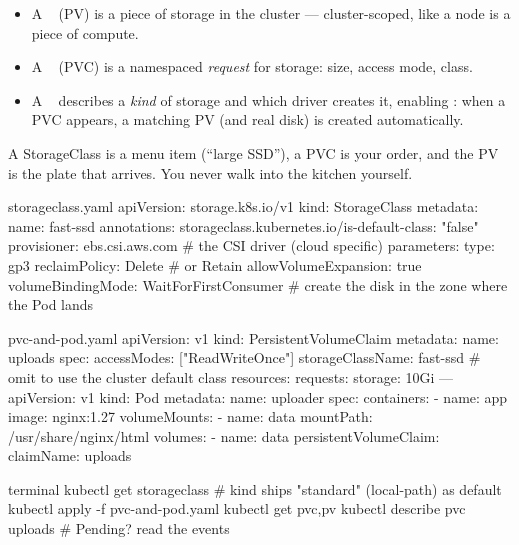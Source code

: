 \begin{itemize}
  \item A ~ (PV) is a piece of storage in the
        cluster --- cluster-scoped, like a node is a piece of compute.
  \item A ~ (PVC) is a namespaced
        \emph{request} for storage: size, access mode, class.
  \item A ~ describes a \emph{kind} of storage and
        which driver creates it, enabling : when a
        PVC appears, a matching PV (and real disk) is created automatically.
\end{itemize}

\begin{analogy}
A StorageClass is a menu item (``large SSD''), a PVC is your order, and the PV
is the plate that arrives. You never walk into the kitchen yourself.
\end{analogy}

\begin{yamlcode}{storageclass.yaml}
apiVersion: storage.k8s.io/v1
kind: StorageClass
metadata:
  name: fast-ssd
  annotations:
    storageclass.kubernetes.io/is-default-class: "false"
provisioner: ebs.csi.aws.com        # the CSI driver (cloud specific)
parameters:
  type: gp3
reclaimPolicy: Delete               # or Retain
allowVolumeExpansion: true
volumeBindingMode: WaitForFirstConsumer   # create the disk in the zone where the Pod lands
\end{yamlcode}

\begin{yamlcode}{pvc-and-pod.yaml}
apiVersion: v1
kind: PersistentVolumeClaim
metadata:
  name: uploads
spec:
  accessModes: ["ReadWriteOnce"]
  storageClassName: fast-ssd        # omit to use the cluster default class
  resources:
    requests:
      storage: 10Gi
---
apiVersion: v1
kind: Pod
metadata:
  name: uploader
spec:
  containers:
    - name: app
      image: nginx:1.27
      volumeMounts:
        - name: data
          mountPath: /usr/share/nginx/html
  volumes:
    - name: data
      persistentVolumeClaim:
        claimName: uploads
\end{yamlcode}

\begin{bashcode}{terminal}
kubectl get storageclass           # kind ships "standard" (local-path) as default
kubectl apply -f pvc-and-pod.yaml
kubectl get pvc,pv
kubectl describe pvc uploads       # Pending? read the events
\end{bashcode}

